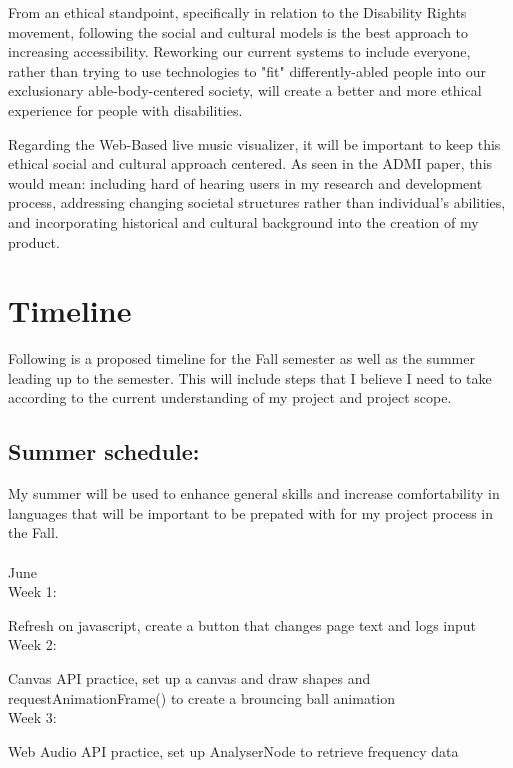 \documentclass[10pt,twocolumn]{article}
\begin{document}
From an ethical standpoint, specifically in relation to the Disability Rights movement, following the social and cultural models is the best approach to increasing accessibility. Reworking our current systems to include everyone, rather than trying to use technologies to "fit" differently-abled people into our exclusionary able-body-centered society, will create a better and more ethical experience for people with disabilities.

Regarding the Web-Based live music visualizer, it will be important to keep this ethical social and cultural approach centered. As seen in the ADMI paper, this would mean: including hard of hearing users in my research and development process, addressing changing societal structures rather than individual's abilities, and incorporating historical and cultural background into the creation of my product.

\section{Timeline}
Following is a proposed timeline for the Fall semester as well as the summer leading up to the semester. This will include steps that I believe I need to take according to the current understanding of my project and project scope. 


\subsection{Summer schedule:}

My summer will be used to enhance general skills and increase comfortability in languages that will be important to be prepated with for my project process in the Fall. \\\\


June\\


    Week 1:

    Refresh on javascript, create a button that changes page text and logs input\\
    
    Week 2:

    Canvas API practice, set up a canvas and draw shapes and requestAnimationFrame() to create a brouncing ball animation\\
    
    Week 3:

    Web Audio API practice, set up AnalyserNode to retrieve frequency data\\
    
\end{document}
